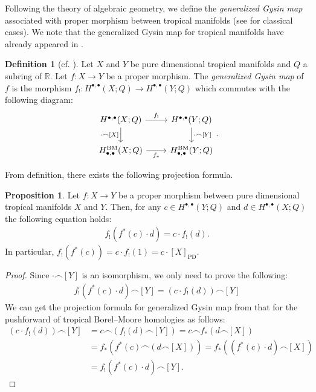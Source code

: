 \documentclass[a4paper,dvipdfmx,reqno,12pt]{amsart}
\theoremstyle{definition}
\newtheorem{definition}[theorem]{Definition}
\newtheorem{proposition}[theorem]{Proposition}
\newcommand{\PD}[1]{[#1]_{\mathrm{PD}}}
\numberwithin{equation}{section}
\begin{document}
Following the theory of algebraic geometry,
we define the \emph{generalized Gysin map}
associated with proper morphism between
tropical manifolds (see  
\cite[Chapter 13. Appendix]{MR2810322}
for classical cases).
We note that the generalized Gysin map
for tropical manifolds
have already appeared in \cite{amini2020hodge}.
\begin{definition}[{cf. \cite{amini2020hodge}}]
Let $X$ and $Y$ be pure dimensional tropical manifolds
and $Q$ a subring of $\mathbb{R}$.
Let $f\colon X\to Y$ be a proper morphism.
The \emph{generalized Gysin map} of $f$ is 
the morphism $f_!\colon H^{\bullet,\bullet}(X;Q)\to 
H^{\bullet,\bullet}(Y;Q)$
which commutes with the following diagram:
\begin{equation}
\begin{tikzcd}
	{H^{\bullet,\bullet}(X;Q)} & {H^{\bullet,\bullet}(Y;Q)} \\
	{H_{\bullet,\bullet}^{\mathrm{BM}}(X;Q)} & {H_{\bullet,\bullet}^{\mathrm{BM}}(Y;Q)}
	\arrow["{\cdot \frown [X]}"', from=1-1, to=2-1]
	\arrow["{\cdot\frown[Y]}", from=1-2, to=2-2]
	\arrow["{f_*}"', from=2-1, to=2-2]
	\arrow["{f_!}", from=1-1, to=1-2]
\end{tikzcd}.   
\end{equation}

\end{definition}
From definition, there exists the following projection formula.
\begin{proposition}
Let $f\colon X\to Y$ be a proper morphism
between pure dimensional
tropical manifolds $X$ and $Y$.
Then, for any $c\in H^{\bullet,\bullet}(Y;Q) $ and
$d\in H^{\bullet,\bullet}(X;Q)$ the following equation holds:
\begin{align}
    f_!(f^{*}(c)\cdot d)=c\cdot f_!(d).
\end{align}
In particular, $f_!(f^{*}(c))=c\cdot f_!(1)=c\cdot \PD{X}$.
\end{proposition}

\begin{proof}
Since $\cdot \frown [Y]$ is an isomorphism, we only need
to prove the following:
\begin{align}
    f_!(f^{*}(c)\cdot d)\frown [Y]=(c\cdot f_!(d))\frown [Y]
\end{align}
We can get the projection formula for generalized Gysin
map from that for the pushforward of tropical 
Borel--Moore homologies as follows:
\begin{align}
(c\cdot f_!(d))\frown [Y]&=
c\frown(f_!(d)\frown [Y])=
c\frown f_*(d\frown [X])\\
&=f_*(f^*(c)\frown (d\frown [X]))
=f_*((f^*(c)\cdot d) \frown [X]) \\
&=f_!(f^{*}(c)\cdot d)\frown [Y].
\end{align}
\end{proof}
\end{document}
